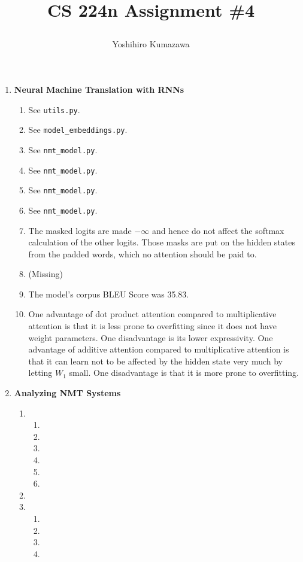 \documentclass[12pt]{article}
\title{
  \vspace{-2cm}
  CS 224n Assignment \#4 \\
  \author{Yoshihiro Kumazawa}
}
\begin{document}
\maketitle
\begin{enumerate}[label=\textbf{\arabic*.}]
  \item \textbf{Neural Machine Translation with RNNs}
  \begin{enumerate}[label=(\alph*)]
    \item See \texttt{utils.py}.
    \item See \texttt{model\_embeddings.py}.
    \item See \texttt{nmt\_model.py}.
    \item See \texttt{nmt\_model.py}.
    \item See \texttt{nmt\_model.py}.
    \item See \texttt{nmt\_model.py}.
    \item The masked logits are made $-\infty$ and hence do not affect the softmax calculation of the other logits. Those masks are put on the hidden states from the padded words, which no attention should be paid to.
    \item (Missing)
    \item The model’s corpus BLEU Score was 35.83.
    \item One advantage of dot product attention compared to multiplicative attention is that it is less prone to overfitting since it does not have weight parameters. One disadvantage is its lower expressivity. One advantage of additive attention compared to multiplicative attention is that it can learn not to be affected by the hidden state very much by letting $W_1$ small. One disadvantage is that it is more prone to overfitting.
  \end{enumerate}
  \item \textbf{Analyzing NMT Systems}
  \begin{enumerate}[label=(\alph*)]
    \item
    \begin{enumerate}[label=\roman*.]
      \item
      \item
      \item
      \item
      \item
      \item
    \end{enumerate}
    \item
    \item
    \begin{enumerate}[label=\roman*.]
      \item
      \item
      \item
      \item
    \end{enumerate}
  \end{enumerate}
\end{enumerate}
\end{document}
